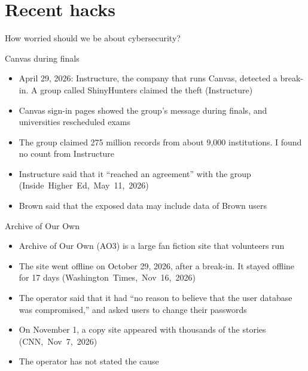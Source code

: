 \documentclass[11pt]{beamer}
\newcommand{\srccite}[1]{{\scriptsize\textcolor{citecol}{#1}}}
\newcommand{\vfy}{\unskip}
\newcommand{\vfy}{\unskip\nobreakspace{\scriptsize\textcolor{citecol}{[verify]}}}
\renewcommand{\srccite}[1]{{\scriptsize\textcolor{citecol}{\mbox{#1}}}}
\begin{document}
\section{Recent hacks}

\begin{transition}{}{How worried should we be about cybersecurity?}
\end{transition}


\begin{frame}{Canvas during finals}
\pause
\begin{itemize}\setlength\itemsep{9pt}
\item April 29, 2026: Instructure, the company that runs Canvas, detected a break-in. A group called ShinyHunters claimed the theft \srccite{(Instructure)} \vfy \pause
\item Canvas sign-in pages showed the group's message during finals, and universities rescheduled exams \vfy \pause
\item The group claimed 275 million records from about 9,000 institutions. I found no count from Instructure \vfy \pause
\item Instructure said that it ``reached an agreement'' with the group \srccite{(Inside Higher Ed, May 11, 2026)} \vfy \pause
\item Brown said that the exposed data may include data of Brown users \vfy
\end{itemize}
\end{frame}


\begin{frame}{Archive of Our Own}
\pause
\begin{itemize}\setlength\itemsep{9pt}
\item Archive of Our Own (AO3) is a large fan fiction site that volunteers run \pause
\item The site went offline on October 29, 2026, after a break-in. It stayed offline for 17 days \srccite{(Washington Times, Nov 16, 2026)} \vfy \pause
\item The operator said that it had ``no reason to believe that the user database was compromised,'' and asked users to change their passwords \vfy \pause
\item On November 1, a copy site appeared with thousands of the stories \srccite{(CNN, Nov 7, 2026)} \vfy \pause
\item The operator has not stated the cause \vfy
\end{itemize}
\end{frame}
\end{document}
